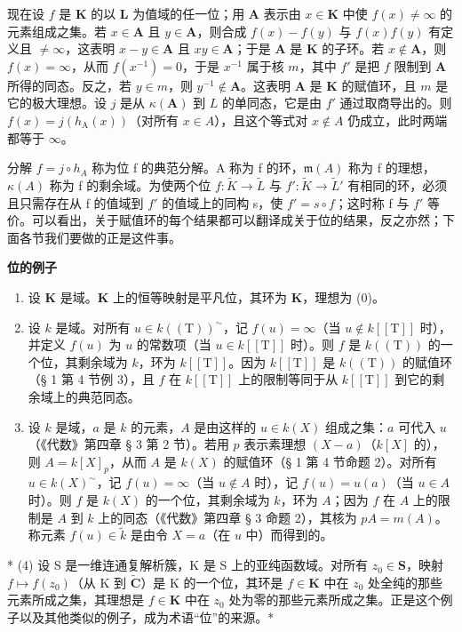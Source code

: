 现在设 \(f\) 是 \(\mathbf{K}\) 的以 \(\mathbf{L}\) 为值域的任一位；用 \(\mathbf{A}\) 表示由 \(x \in \mathbf{K}\) 中使 \(f(x) \neq \infty\) 的元素组成之集。若 \(x \in \mathbf{A}\) 且 \(y \in \mathbf{A}\)，则合成 \(f(x) - f(y)\) 与 \(f(x)f(y)\) 有定义且 \(\neq \infty\)，这表明 \(x - y \in \mathbf{A}\) 且 \(xy \in \mathbf{A}\)；于是 \(\mathbf{A}\) 是 \(\mathbf{K}\) 的子环。若 \(x \notin \mathbf{A}\)，则 \(f(x) = \infty\)，从而 \(f(x^{-1}) = 0\)，于是 \(x^{-1}\) 属于核 \(m\)，其中 \(f'\) 是把 \(f\) 限制到 \(\mathbf{A}\) 所得的同态。反之，若 \(y \in m\)，则 \(y^{-1} \notin \mathbf{A}\)。这表明 \(\mathbf{A}\) 是 \(\mathbf{K}\) 的赋值环，且 \(m\) 是它的极大理想。设 \(j\) 是从 \(\kappa(\mathbf{A})\) 到 \(L\) 的单同态，它是由 \(f'\) 通过取商导出的。则 \(f(x) = j(h_{\mathrm{A}}(x))\)（对所有 \(x \in A\)），且这个等式对 \(x \notin A\) 仍成立，此时两端都等于 \(\infty\)。

分解 \(f = j \circ h_{A}\) 称为位 f 的典范分解。A 称为 f 的环，\(\mathfrak{m}(A)\) 称为 f 的理想，\(\kappa(A)\) 称为 f 的剩余域。为使两个位 \(f: \tilde{K} \to \tilde{L}\) 与 \(f': \tilde{K} \to \tilde{L}'\) 有相同的环，必须且只需存在从 f 的值域到 \(f'\) 的值域上的同构 s，使 \(f' = s \circ f\)；这时称 f 与 \(f'\) 等价。可以看出，关于赋值环的每个结果都可以翻译成关于位的结果，反之亦然；下面各节我们要做的正是这件事。

\textbf{位的例子}\par

\begin{enumerate}
\def\labelenumi{(\arabic{enumi})}
\item
  设 \(\mathbf{K}\) 是域。\(\mathbf{K}\) 上的恒等映射是平凡位，其环为 \(\mathbf{K}\)，理想为 (0)。
\item
  设 \(k\) 是域。对所有 \(u \in k((\mathrm{T}))^{\sim}\)，记 \(f(u) = \infty\)（当 \(u \notin k[[\mathrm{T}]]\) 时），并定义 \(f(u)\) 为 \(u\) 的常数项（当 \(u \in k[[\mathrm{T}]]\) 时）。则 \(f\) 是 \(k((\mathrm{T}))\) 的一个位，其剩余域为 \(k\)，环为 \(k[[\mathrm{T}]]\)。因为 \(k[[\mathrm{T}]]\) 是 \(k((\mathrm{T}))\) 的赋值环（§ 1 第 4 节例 3），且 \(f\) 在 \(k[[\mathrm{T}]]\) 上的限制等同于从 \(k[[\mathrm{T}]]\) 到它的剩余域上的典范同态。
\item
  设 \(k\) 是域，\(a\) 是 \(k\) 的元素，\(A\) 是由这样的 \(u \in k(X)\) 组成之集：\(a\) 可代入 \(u\)（《代数》第四章 § 3 第 2 节）。若用 \(p\) 表示素理想 \((X - a)\)（\(k[X]\) 的），则 \(A = k[X]_p\)，从而 \(A\) 是 \(k(X)\) 的赋值环（§ 1 第 4 节命题 2）。对所有 \(u \in k(X)^{\sim}\)，记 \(f(u) = \infty\)（当 \(u \notin A\) 时），记 \(f(u) = u(a)\)（当 \(u \in A\) 时）。则 \(f\) 是 \(k(X)\) 的一个位，其剩余域为 \(k\)，环为 \(A\)；因为 \(f\) 在 \(A\) 上的限制是 \(A\) 到 \(k\) 上的同态（《代数》第四章 § 3 命题 2），其核为 \(pA = m(A)\)。称元素 \(f(u) \in \tilde{k}\) 是由令 \(X = a\)（在 \(u\) 中）而得到的。
\end{enumerate}

* (4) 设 S 是一维连通复解析簇，K 是 S 上的亚纯函数域。对所有 \(z_0 \in \mathbf{S}\)，映射 \(f \mapsto f(z_0)\)（从 K 到 \(\tilde{\mathbf{C}}\)）是 K 的一个位，其环是 \(f \in \mathbf{K}\) 中在 \(z_0\) 处全纯的那些元素所成之集，其理想是 \(f \in \mathbf{K}\) 中在 \(z_0\) 处为零的那些元素所成之集。正是这个例子以及其他类似的例子，成为术语“位”的来源。*

